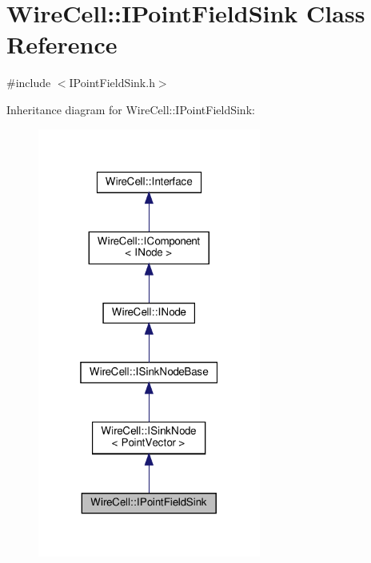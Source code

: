 \hypertarget{class_wire_cell_1_1_i_point_field_sink}{}\section{Wire\+Cell\+:\+:I\+Point\+Field\+Sink Class Reference}
\label{class_wire_cell_1_1_i_point_field_sink}


{\ttfamily \#include $<$I\+Point\+Field\+Sink.\+h$>$}



Inheritance diagram for Wire\+Cell\+:\+:I\+Point\+Field\+Sink\+:
\nopagebreak
\begin{figure}[H]
\begin{center}
\leavevmode
\includegraphics[width=208pt]{class_wire_cell_1_1_i_point_field_sink__inherit__graph}
\end{center}
\end{figure}



